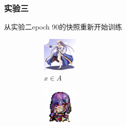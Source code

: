 \documentclass{beamer}
\begin{document}
\begin{frame}
\frametitle{实验三}
从实验二epoch 90的快照重新开始训练

\begin{figure}[htb]
    \centering
    \begin{subfigure}[b]{0.23\linewidth}
        \includegraphics[width=\linewidth]{exp3_epoch194_real_A.png}
        \caption{$x \in A$}
      \end{subfigure}
      \begin{subfigure}[b]{0.23\linewidth}
        \includegraphics[width=\linewidth]{exp3_epoch194_fake_B.png}

\end{subfigure}
\end{figure}
\end{frame}
\end{document}
